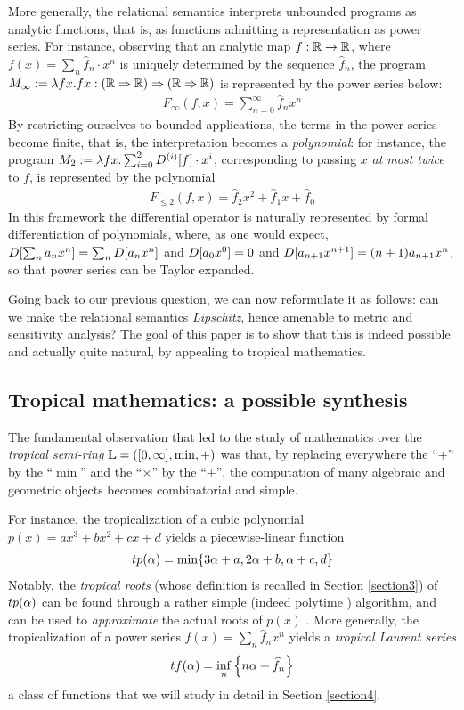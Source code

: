 More generally, the relational semantics interprets unbounded programs as analytic functions, that is, as functions admitting a representation as power series. For instance, observing that an analytic map $f: \mathbb{R}\to \mathbb{R}$, where $f(x)=\sum_{n}\widehat f_{n}\cdot x^{n}$ is uniquely determined by the sequence $\widehat f_{n}$, the program $M_{\infty}:=\lambda fx.fx: (\mathbb{R}\Rightarrow \mathbb{R})\Rightarrow (\mathbb{R}\Rightarrow \mathbb{R})$ is represented by the power series below:
\begin{align}
F_{\infty}(f,x)= \sum_{n=0}^{\infty} \widehat f_{n} x^{n}
\end{align}
By restricting ourselves to bounded applications, the terms in the power series become finite, that is, the interpretation becomes a \emph{polynomial}: for instance, the program $M_{2}:=\lambda fx. \sum_{i=0}^{2}\Der^{(i)}[f]\cdot x^{i}$, corresponding to passing $x$ \emph{at most twice} to $f$, is represented by the polynomial
\begin{align}
F_{\leq 2}(f,x)=\widehat f_{2} x^{2}  + \widehat f_{1}x +  \widehat f_{0} 
\end{align}
 In this framework the differential operator is naturally represented by formal differentiation of polynomials, where, as one would expect, 
 $\Der[\sum_{n}a_{n}x^{n}]=\sum_{n}\Der[a_{n}x^{n}]$ and $\Der[a_{0}x^{0}]=0$ and $\Der[a_{n+1}x^{n+1}]= (n+1)a_{n+1}x^{n}$, so that power series can be Taylor expanded. 
 
Going back to our previous question, we can now reformulate it as follows: can we make the relational semantics \emph{Lipschitz}, hence amenable to metric and sensitivity analysis? The goal of this paper is to show that this is indeed possible and actually quite natural, by appealing to tropical mathematics.
 
\subsection{Tropical mathematics: a possible synthesis}
The fundamental observation that led to the study of mathematics over the \emph{tropical semi-ring} $\mathbb{L}=([0,\infty],\min,+)$ was that, by replacing everywhere the ``$+$'' by the ``$\min$'' and the ``$\times$'' by the ``$+$'', the computation of many algebraic and geometric objects becomes combinatorial and simple. 

For instance, the tropicalization of a cubic polynomial $p(x)=ax^{3}+bx^{2}+cx+d$ yields a piecewise-linear function 
\begin{align}
\trop p(\alpha)= \min\{ 3\alpha+a, 2\alpha+b, \alpha+c,d\}
\end{align}
Notably, the \emph{tropical roots} (whose definition is recalled in Section \ref{section3}) of $\trop p(\alpha)$ can be found through a rather simple (indeed polytime \cite{}) algorithm, and can be used to \emph{approximate} the actual roots of $p(x)$ \cite{}. 
More generally, the tropicalization of a power series $f(x)=\sum_{n}\widehat f_{n}x^{n}$ yields a \emph{tropical Laurent series} \cite{} 
\begin{align}
\trop f(\alpha)= \inf_{n}\left\{n\alpha+ \widehat f_{n}\right\}
\end{align}
a class of functions that we will study in detail in Section \ref{section4}.

